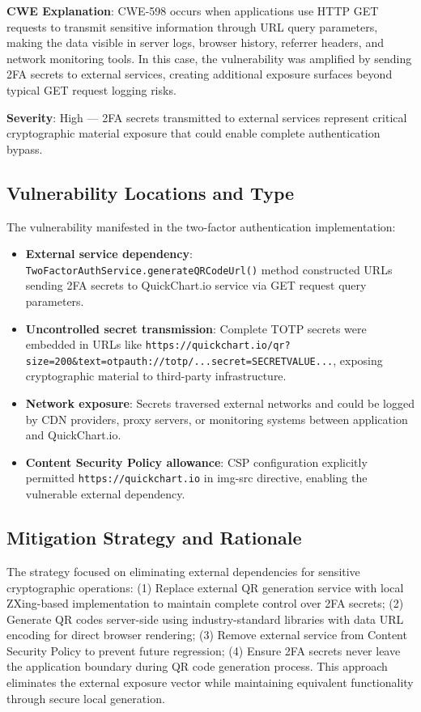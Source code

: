 \documentclass[]{UCD_CS_FYP_Report}
\begin{document}
	\textbf{CWE Explanation}: CWE-598 occurs when applications use HTTP GET requests to transmit sensitive information through URL query parameters, making the data visible in server logs, browser history, referrer headers, and network monitoring tools. In this case, the vulnerability was amplified by sending 2FA secrets to external services, creating additional exposure surfaces beyond typical GET request logging risks.

	\textbf{Severity}: High — 2FA secrets transmitted to external services represent critical cryptographic material exposure that could enable complete authentication bypass.

\subsection{Vulnerability Locations and Type}
The vulnerability manifested in the two-factor authentication implementation:
\begin{itemize}
	\item \textbf{External service dependency}: \texttt{TwoFactorAuthService.generateQRCodeUrl()} method constructed URLs sending 2FA secrets to QuickChart.io service via GET request query parameters.
	\item \textbf{Uncontrolled secret transmission}: Complete TOTP secrets were embedded in URLs like \texttt{https://quickchart.io/qr?size=200\&text=otpauth://totp/...secret=SECRETVALUE...}, exposing cryptographic material to third-party infrastructure.
	\item \textbf{Network exposure}: Secrets traversed external networks and could be logged by CDN providers, proxy servers, or monitoring systems between application and QuickChart.io.
	\item \textbf{Content Security Policy allowance}: CSP configuration explicitly permitted \texttt{https://quickchart.io} in img-src directive, enabling the vulnerable external dependency.
\end{itemize}

\subsection{Mitigation Strategy and Rationale}
The strategy focused on eliminating external dependencies for sensitive cryptographic operations: (1) Replace external QR generation service with local ZXing-based implementation to maintain complete control over 2FA secrets; (2) Generate QR codes server-side using industry-standard libraries with data URL encoding for direct browser rendering; (3) Remove external service from Content Security Policy to prevent future regression; (4) Ensure 2FA secrets never leave the application boundary during QR code generation process. This approach eliminates the external exposure vector while maintaining equivalent functionality through secure local generation.
\end{document}
